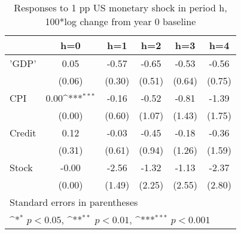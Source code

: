 \begin{table}[htbp]\centering
\def\sym#1{\ifmmode^{#1}\else\(^{#1}\)\fi}
\caption{Responses to 1 pp US monetary shock in period h, 100*log change from year 0 baseline}
\begin{tabular}{l*{5}{c}}
\hline\hline
            &\multicolumn{1}{c}{h=0}&\multicolumn{1}{c}{h=1}&\multicolumn{1}{c}{h=2}&\multicolumn{1}{c}{h=3}&\multicolumn{1}{c}{h=4}\\
\hline
'GDP'       &        0.05         &       -0.57         &       -0.65         &       -0.53         &       -0.56         \\
            &      (0.06)         &      (0.30)         &      (0.51)         &      (0.64)         &      (0.75)         \\
[1em]
CPI         &        0.00\sym{***}&       -0.16         &       -0.52         &       -0.81         &       -1.39         \\
            &      (0.00)         &      (0.60)         &      (1.07)         &      (1.43)         &      (1.75)         \\
[1em]
Credit      &        0.12         &       -0.03         &       -0.45         &       -0.18         &       -0.36         \\
            &      (0.31)         &      (0.61)         &      (0.94)         &      (1.26)         &      (1.59)         \\
[1em]
Stock       &       -0.00         &       -2.56         &       -1.32         &       -1.13         &       -2.37         \\
            &      (0.00)         &      (1.49)         &      (2.25)         &      (2.55)         &      (2.80)         \\
\hline\hline
\multicolumn{6}{l}{\footnotesize Standard errors in parentheses}\\
\multicolumn{6}{l}{\footnotesize \sym{*} \(p<0.05\), \sym{**} \(p<0.01\), \sym{***} \(p<0.001\)}\\
\end{tabular}
\end{table}
